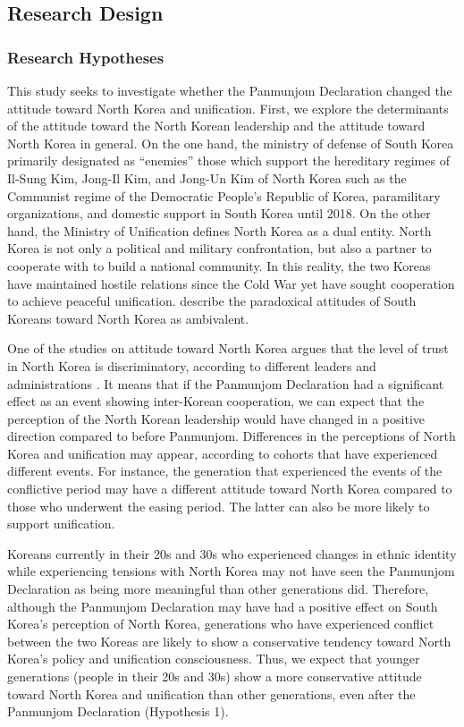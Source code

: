 \documentclass[letterpaper,9pt,twocolumn,twoside,]{pinp}
\begin{document}
\hypertarget{research-design}{%
\subsection{Research Design}\label{research-design}}

\hypertarget{research-hypotheses}{%
\subsubsection{Research Hypotheses}\label{research-hypotheses}}

This study seeks to investigate whether the Panmunjom Declaration
changed the attitude toward North Korea and unification. First, we
explore the determinants of the attitude toward the North Korean
leadership and the attitude toward North Korea in general. On the one
hand, the ministry of defense of South Korea primarily designated as
``enemies'' those which support the hereditary regimes of Il-Sung Kim,
Jong-Il Kim, and Jong-Un Kim of North Korea such as the Communist regime
of the Democratic People's Republic of Korea, paramilitary
organizations, and domestic support in South Korea until 2018. On the
other hand, the Ministry of Unification defines North Korea as a dual
entity. North Korea is not only a political and military confrontation,
but also a partner to cooperate with to build a national community. In
this reality, the two Koreas have maintained hostile relations since the
Cold War yet have sought cooperation to achieve peaceful unification.
\citet{Kim2003} describe the paradoxical attitudes of South Koreans
toward North Korea as ambivalent.

One of the studies on attitude toward North Korea argues that the level
of trust in North Korea is discriminatory, according to different
leaders and administrations \citep[130-131]{Lee2013c}. It means that if
the Panmunjom Declaration had a significant effect as an event showing
inter-Korean cooperation, we can expect that the perception of the North
Korean leadership would have changed in a positive direction compared to
before Panmunjom. Differences in the perceptions of North Korea and
unification may appear, according to cohorts that have experienced
different events. For instance, the generation that experienced the
events of the conflictive period may have a different attitude toward
North Korea compared to those who underwent the easing period. The
latter can also be more likely to support unification.

Koreans currently in their 20s and 30s who experienced changes in ethnic
identity while experiencing tensions with North Korea may not have seen
the Panmunjom Declaration as being more meaningful than other
generations did. Therefore, although the Panmunjom Declaration may have
had a positive effect on South Korea's perception of North Korea,
generations who have experienced conflict between the two Koreas are
likely to show a conservative tendency toward North Korea's policy and
unification consciousness. Thus, we expect that younger generations
(people in their 20s and 30s) show a more conservative attitude toward
North Korea and unification than other generations, even after the
Panmunjom Declaration (Hypothesis 1).
\end{document}
